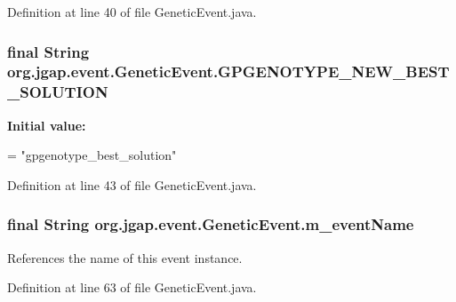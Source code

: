 Definition at line 40 of file Genetic\-Event.\-java.

\hypertarget{classorg_1_1jgap_1_1event_1_1_genetic_event_a9fef77e1b6f180761ff13984f153b6d5}{
\subsubsection[{G\-P\-G\-E\-N\-O\-T\-Y\-P\-E\-\_\-\-N\-E\-W\-\_\-\-B\-E\-S\-T\-\_\-\-S\-O\-L\-U\-T\-I\-O\-N}]{\setlength{\rightskip}{0pt plus 5cm}final String org.\-jgap.\-event.\-Genetic\-Event.\-G\-P\-G\-E\-N\-O\-T\-Y\-P\-E\-\_\-\-N\-E\-W\-\_\-\-B\-E\-S\-T\-\_\-\-S\-O\-L\-U\-T\-I\-O\-N\hspace{0.3cm}{\ttfamily [static]}}}\label{classorg_1_1jgap_1_1event_1_1_genetic_event_a9fef77e1b6f180761ff13984f153b6d5}
{\bfseries Initial value\-:}
\begin{DoxyCode}
=
      \textcolor{stringliteral}{"gpgenotype\_best\_solution"}
\end{DoxyCode}


Definition at line 43 of file Genetic\-Event.\-java.

\hypertarget{classorg_1_1jgap_1_1event_1_1_genetic_event_a6ceccc2dd0c9992e451a173599a54914}{
\subsubsection[{m\-\_\-event\-Name}]{\setlength{\rightskip}{0pt plus 5cm}final String org.\-jgap.\-event.\-Genetic\-Event.\-m\-\_\-event\-Name\hspace{0.3cm}{\ttfamily [private]}}}\label{classorg_1_1jgap_1_1event_1_1_genetic_event_a6ceccc2dd0c9992e451a173599a54914}
References the name of this event instance. 

Definition at line 63 of file Genetic\-Event.\-java.



